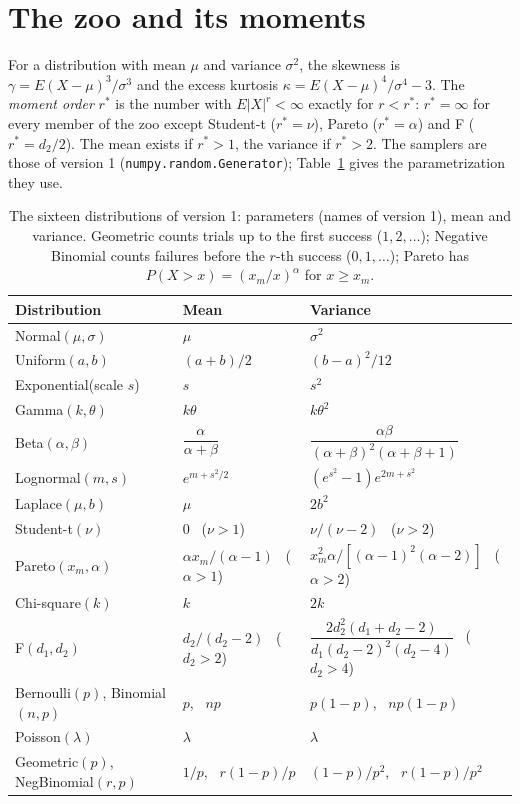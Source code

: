 \documentclass[11pt,a4paper]{article}
\begin{document}
\section{The zoo and its moments}

For a distribution with mean $\mu$ and variance $\sigma^2$, the skewness is $\gamma = E(X-\mu)^3/\sigma^3$ and the excess kurtosis
$\kappa = E(X-\mu)^4/\sigma^4 - 3$. The \emph{moment order} $r^\ast$ is the number with $E|X|^r < \infty$ exactly for $r < r^\ast$:
$r^\ast = \infty$ for every member of the zoo except Student-t ($r^\ast = \nu$), Pareto ($r^\ast = \alpha$) and F
($r^\ast = d_2/2$). The mean exists if $r^\ast > 1$, the variance if $r^\ast > 2$. The samplers are those of version 1
(\texttt{numpy.random.Generator}); Table~\ref{tab:zoo} gives the parametrization they use.

\begin{table}[h]
\centering\scriptsize\setlength{\tabcolsep}{3pt}
\caption{The sixteen distributions of version 1: parameters (names of version 1), mean and variance. Geometric counts trials up to
the first success ($1, 2, \dots$); Negative Binomial counts failures before the $r$-th success ($0, 1, \dots$); Pareto has
$P(X > x) = (x_m/x)^{\alpha}$ for $x \ge x_m$.}\label{tab:zoo}
\begin{tabular}{lll}
\toprule
Distribution & Mean & Variance \\
\midrule
Normal$(\mu,\sigma)$ & $\mu$ & $\sigma^2$ \\
Uniform$(a,b)$ & $(a+b)/2$ & $(b-a)^2/12$ \\
Exponential(scale $s$) & $s$ & $s^2$ \\
Gamma$(k,\theta)$ & $k\theta$ & $k\theta^2$ \\
Beta$(\alpha,\beta)$ & $\dfrac{\alpha}{\alpha+\beta}$ & $\dfrac{\alpha\beta}{(\alpha+\beta)^2(\alpha+\beta+1)}$ \\
Lognormal$(m,s)$ & $e^{m+s^2/2}$ & $(e^{s^2}-1)e^{2m+s^2}$ \\
Laplace$(\mu,b)$ & $\mu$ & $2b^2$ \\
Student-t$(\nu)$ & $0$ \ ($\nu>1$) & $\nu/(\nu-2)$ \ ($\nu>2$) \\
Pareto$(x_m,\alpha)$ & $\alpha x_m/(\alpha-1)$ \ ($\alpha>1$) & $x_m^2\alpha/[(\alpha-1)^2(\alpha-2)]$ \ ($\alpha>2$) \\
Chi-square$(k)$ & $k$ & $2k$ \\
F$(d_1,d_2)$ & $d_2/(d_2-2)$ \ ($d_2>2$) & $\dfrac{2d_2^2(d_1+d_2-2)}{d_1(d_2-2)^2(d_2-4)}$ \ ($d_2>4$) \\
Bernoulli$(p)$, Binomial$(n,p)$ & $p$, \ $np$ & $p(1-p)$, \ $np(1-p)$ \\
Poisson$(\lambda)$ & $\lambda$ & $\lambda$ \\
Geometric$(p)$, NegBinomial$(r,p)$ & $1/p$, \ $r(1-p)/p$ & $(1-p)/p^2$, \ $r(1-p)/p^2$ \\
\bottomrule
\end{tabular}
\end{table}
\end{document}
